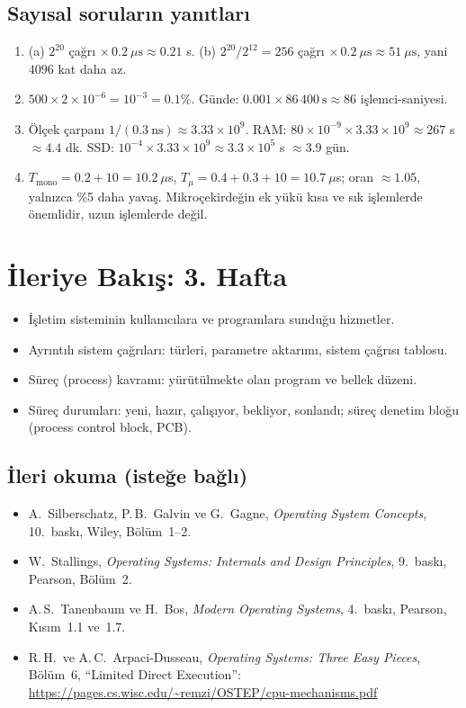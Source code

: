\documentclass[11pt,a4paper]{article}
\begin{document}
\subsection*{Sayısal soruların yanıtları}
\begin{enumerate}[leftmargin=1.6em,start=11]
  \item (a) $2^{20}$ çağrı $\times\, 0.2\ \mu\text{s} \approx 0.21$ s. (b) $2^{20}/2^{12} = 256$ çağrı $\times\, 0.2\ \mu\text{s} \approx 51\ \mu\text{s}$, yani $4096$ kat daha az.
  \item $500 \times 2\times10^{-6} = 10^{-3} = 0.1\%$. Günde: $0.001 \times 86\,400\ \text{s} \approx 86$ işlemci-saniyesi.
  \item Ölçek çarpanı $1/(0.3\ \text{ns}) \approx 3.33\times10^{9}$. RAM: $80\times10^{-9} \times 3.33\times10^{9} \approx 267$ s $\approx 4.4$ dk. SSD: $10^{-4} \times 3.33\times10^{9} \approx 3.3\times10^{5}$ s $\approx 3.9$ gün.
  \item $T_{\text{mono}} = 0.2 + 10 = 10.2\ \mu$s, $T_{\mu} = 0.4 + 0.3 + 10 = 10.7\ \mu$s; oran $\approx 1.05$, yalnızca \%5 daha yavaş. Mikroçekirdeğin ek yükü kısa ve sık işlemlerde önemlidir, uzun işlemlerde değil.
\end{enumerate}

\section{İleriye Bakış: 3. Hafta}

\begin{itemize}
  \item İşletim sisteminin kullanıcılara ve programlara sunduğu hizmetler.
  \item Ayrıntılı sistem çağrıları: türleri, parametre aktarımı, sistem çağrısı tablosu.
  \item Süreç (process) kavramı: yürütülmekte olan program ve bellek düzeni.
  \item Süreç durumları: yeni, hazır, çalışıyor, bekliyor, sonlandı; süreç denetim bloğu (process control block, PCB).
\end{itemize}

\subsection*{İleri okuma (isteğe bağlı)}
\begin{itemize}
  \item A.\ Silberschatz, P.\,B.\ Galvin ve G.\ Gagne, \emph{Operating System Concepts}, 10.\ baskı, Wiley, Bölüm~1--2.
  \item W.\ Stallings, \emph{Operating Systems: Internals and Design Principles}, 9.\ baskı, Pearson, Bölüm~2.
  \item A.\,S.\ Tanenbaum ve H.\ Bos, \emph{Modern Operating Systems}, 4.\ baskı, Pearson, Kısım~1.1 ve~1.7.
  \item R.\,H.\ ve A.\,C.\ Arpaci-Dusseau, \emph{Operating Systems: Three Easy Pieces}, Bölüm~6, ``Limited Direct Execution'': \url{https://pages.cs.wisc.edu/~remzi/OSTEP/cpu-mechanisms.pdf}
\end{itemize}
\end{document}
